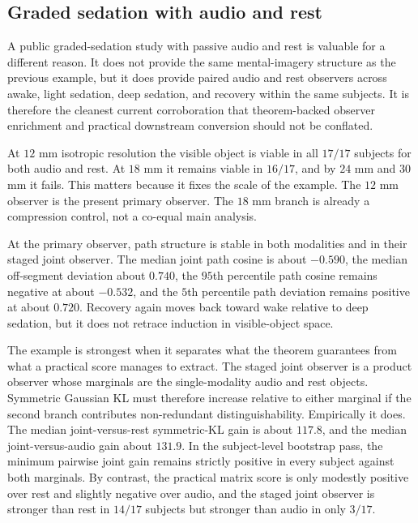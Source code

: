 \documentclass[11pt,a4paper]{article}
\numberwithin{equation}{section}
\theoremstyle{thmcompact}
\theoremstyle{remark}
\begin{document}
\subsection{Graded sedation with audio and rest}

A public graded-sedation study with passive audio and rest is valuable for a different reason. It does not provide the same mental-imagery structure as the previous example, but it does provide paired audio and rest observers across awake, light sedation, deep sedation, and recovery within the same subjects. It is therefore the cleanest current corroboration that theorem-backed observer enrichment and practical downstream conversion should not be conflated.

At \(12\) mm isotropic resolution the visible object is viable in all \(17/17\) subjects for both audio and rest. At \(18\) mm it remains viable in \(16/17\), and by \(24\) mm and \(30\) mm it fails. This matters because it fixes the scale of the example. The \(12\) mm observer is the present primary observer. The \(18\) mm branch is already a compression control, not a co-equal main analysis.

At the primary observer, path structure is stable in both modalities and in their staged joint observer. The median joint path cosine is about \(-0.590\), the median off-segment deviation about \(0.740\), the \(95\)th percentile path cosine remains negative at about \(-0.532\), and the \(5\)th percentile path deviation remains positive at about \(0.720\). Recovery again moves back toward wake relative to deep sedation, but it does not retrace induction in visible-object space.

The example is strongest when it separates what the theorem guarantees from what a practical score manages to extract. The staged joint observer is a product observer whose marginals are the single-modality audio and rest objects. Symmetric Gaussian KL must therefore increase relative to either marginal if the second branch contributes non-redundant distinguishability. Empirically it does. The median joint-versus-rest symmetric-KL gain is about \(117.8\), and the median joint-versus-audio gain about \(131.9\). In the subject-level bootstrap pass, the minimum pairwise joint gain remains strictly positive in every subject against both marginals. By contrast, the practical matrix score is only modestly positive over rest and slightly negative over audio, and the staged joint observer is stronger than rest in \(14/17\) subjects but stronger than audio in only \(3/17\).
\end{document}
